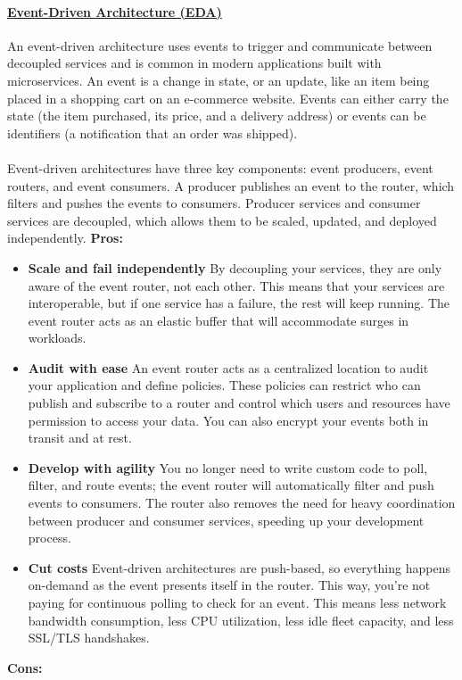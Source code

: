 \documentclass[10pt,a4paper]{article}
\newcommand{\nline}{\\~\\}
\begin{document}
\paragraph{\uline{Event-Driven Architecture (EDA)}}
An event-driven architecture uses events to trigger and communicate between decoupled services and is common in modern applications built with microservices. An event is a change in state, or an update, like an item being placed in a shopping cart on an e-commerce website. Events can either carry the state (the item purchased, its price, and a delivery address) or events can be identifiers (a notification that an order was shipped).
\nline
Event-driven architectures have three key components: event producers, event routers, and event consumers. A producer publishes an event to the router, which filters and pushes the events to consumers. Producer services and consumer services are decoupled, which allows them to be scaled, updated, and deployed independently.
\textbf{Pros:}
\begin{itemize}
		\item \textbf{Scale and fail independently}
By decoupling your services, they are only aware of the event router, not each other. This means that your services are interoperable, but if one service has a failure, the rest will keep running. The event router acts as an elastic buffer that will accommodate surges in workloads.
	\item \textbf{Audit with ease}
An event router acts as a centralized location to audit your application and define policies. These policies can restrict who can publish and subscribe to a router and control which users and resources have permission to access your data. You can also encrypt your events both in transit and at rest.
	\item \textbf{Develop with agility}
You no longer need to write custom code to poll, filter, and route events; the event router will automatically filter and push events to consumers. The router also removes the need for heavy coordination between producer and consumer services, speeding up your development process.
	\item \textbf{Cut costs}
Event-driven architectures are push-based, so everything happens on-demand as the event presents itself in the router. This way, you’re not paying for continuous polling to check for an event. This means less network bandwidth consumption, less CPU utilization, less idle fleet capacity, and less SSL/TLS handshakes.
\end{itemize}
\textbf{Cons:}
\end{document}
